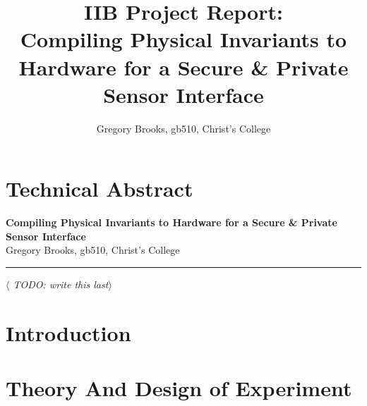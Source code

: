 \documentclass[12pt]{article}
\begin{document}

\clearpage \mbox{}
\clearpage
{}

\noindent

%
%

\title
{
  IIB Project Report:\\
  Compiling Physical Invariants to Hardware for a Secure \& Private Sensor Interface\\
}
\author{Gregory Brooks, gb510, Christ's College}
\date{}
\maketitle

\tableofcontents

\clearpage
{}

%
%

\section{Technical Abstract}

\begin{center}
{
  \bf Compiling Physical Invariants to Hardware for a Secure \& Private Sensor Interface\\
}
Gregory Brooks, gb510, Christ's College
\end{center}
\rule{15.7cm}{0.5mm}
\vspace{1cm}


\textit{$\langle$ TODO: write this last$\rangle$}

\newpage



%
%

\section{Introduction}

\newpage



%
%

\section{Theory And Design of Experiment}

\newpage



%
%
\end{document}
